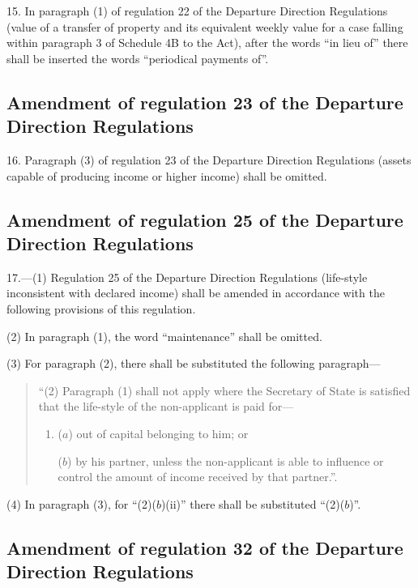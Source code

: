 \documentclass[12pt,a4paper]{article}
\begin{document}
15.  In paragraph (1) of regulation 22 of the Departure Direction Regulations (value of a transfer of property and its equivalent weekly value for a case falling within paragraph 3 of Schedule 4B to the Act), after the words “in lieu of” there shall be inserted the words “periodical payments of”.

\subsection[16. Amendment of regulation 23 of the Departure Direction Regulations]{Amendment of regulation 23 of the Departure Direction Regulations}

16.  Paragraph (3) of regulation 23 of the Departure Direction Regulations (assets capable of producing income or higher income) shall be omitted.

\subsection[17. Amendment of regulation 25 of the Departure Direction Regulations]{Amendment of regulation 25 of the Departure Direction Regulations}

17.—(1) Regulation 25 of the Departure Direction Regulations (life-style inconsistent with declared income) shall be amended in accordance with the following provisions of this regulation.

(2) In paragraph (1), the word “maintenance” shall be omitted.

(3) For paragraph (2), there shall be substituted the following paragraph—
\begin{quotation}
“(2) Paragraph (1) shall not apply where the Secretary of State is satisfied that the life-style of the non-applicant is paid for—
\begin{enumerate}\item[]
($a$) out of capital belonging to him; or

($b$) by his partner, unless the non-applicant is able to influence or control the amount of income received by that partner.”.
\end{enumerate}
\end{quotation}

(4) In paragraph (3), for “(2)($b$)(ii)” there shall be substituted “(2)($b$)”.

\subsection[18. Amendment of regulation 32 of the Departure Direction Regulations]{Amendment of regulation 32 of the Departure Direction Regulations}
\end{document}
